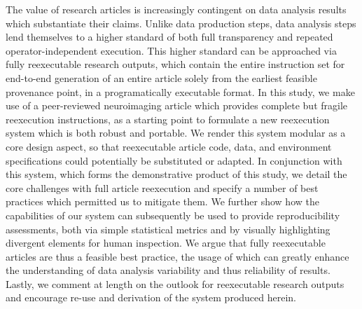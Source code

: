 The value of research articles is increasingly contingent on data analysis results which substantiate their claims.
Unlike data production steps, data analysis steps lend themselves to a higher standard of both full transparency and repeated operator-independent execution.
This higher standard can be approached via fully reexecutable research outputs, which contain the entire instruction set for end-to-end generation of an entire article solely from the earliest feasible provenance point, in a programatically executable format.
In this study, we make use of a peer-reviewed neuroimaging article which provides complete but fragile reexecution instructions, as a starting point to formulate a new reexecution system which is both robust and portable.
We render this system modular as a core design aspect, so that reexecutable article code, data, and environment specifications could potentially be substituted or adapted.
In conjunction with this system, which forms the demonstrative product of this study, we detail the core challenges with full article reexecution and specify a number of best practices which permitted us to mitigate them.
We further show how the capabilities of our system can subsequently be used to provide reproducibility assessments, both via simple statistical metrics and by visually highlighting divergent elements for human inspection.
We argue that fully reexecutable articles are thus a feasible best practice, the usage of which can greatly enhance the understanding of data analysis variability and thus reliability of results.
Lastly, we comment at length on the outlook for reexecutable research outputs and encourage re-use and derivation of the system produced herein.

